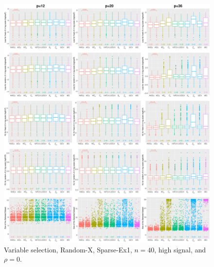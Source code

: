 \begin{figure}[!ht]
\centering
\includegraphics[width=\textwidth]{figures/supplement/randomx/subset_selection/Sparse-Ex1_n40_hsnr_rho0.eps}
\caption{Variable selection, Random-X, Sparse-Ex1, $n=40$, high signal, and $\rho=0$.}
\end{figure}
\clearpage
